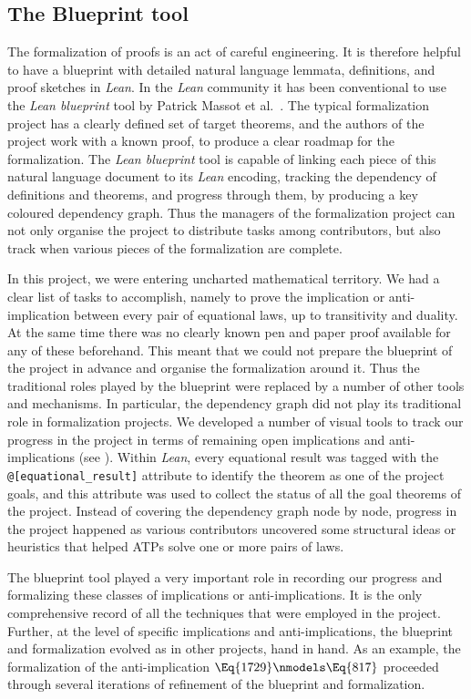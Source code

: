 \subsection{The Blueprint tool}

The formalization of proofs is an act of careful engineering. It is therefore helpful to have a blueprint with detailed natural language lemmata, definitions, and proof sketches in \emph{Lean}. In the \emph{Lean} community it has been conventional to use the \emph{Lean blueprint} tool by Patrick Massot et al.~\cite{GitHubGitHubPatrickMassotleanblueprint}. The typical formalization project has a clearly defined set of target theorems, and the authors of the project work with a known proof, to produce a clear roadmap for the formalization. The \emph{Lean blueprint} tool is capable of linking each piece of this natural language document to its \emph{Lean} encoding, tracking the dependency of definitions and theorems, and progress through them, by producing a key coloured dependency graph. Thus the managers of the formalization project can not only organise the project to distribute tasks among contributors, but also track when various pieces of the formalization are complete.

In this project, we were entering uncharted mathematical territory. We had a clear list of tasks to accomplish, namely to prove the implication or anti-implication between every pair of equational laws, up to transitivity and duality. At the same time there was no clearly known pen and paper proof available for any of these beforehand. This meant that we could not prepare the blueprint of the project in advance and organise the formalization around it. Thus the traditional roles played by the blueprint were replaced by a number of other tools and mechanisms. In particular, the dependency graph did not play its traditional role in formalization projects. We developed a number of visual tools to track our progress in the project in terms of remaining open implications and anti-implications (see ). Within \emph{Lean}, every equational result was tagged with the \texttt{@[equational\_result]} attribute to identify the theorem as one of the project goals, and this attribute was used to collect the status of all the goal theorems of the project. Instead of covering the dependency graph node by node, progress in the project happened as various contributors uncovered some structural ideas or heuristics that helped ATPs solve one or more pairs of laws.

The blueprint tool played a very important role in recording our progress and formalizing these classes of implications or anti-implications. It is the only comprehensive record of all the techniques that were employed in the project. Further, at the level of specific implications and anti-implications, the blueprint and formalization evolved as in other projects, hand in hand. As an example, the formalization of the anti-implication $\Eq{1729} \nmodels \Eq{817}$ proceeded through several iterations of refinement of the blueprint and formalization.

